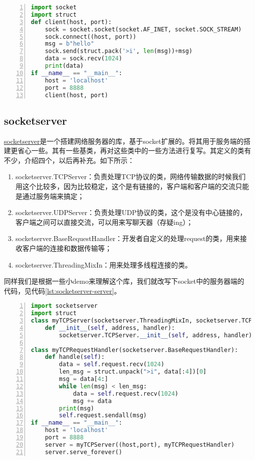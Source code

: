 \begin{lstlisting}[language = python, caption={socket客户端代码}, label={lst:socket-client}, numbers=left, 
       numberstyle=\tiny,keywordstyle=\color{blue!70},
       commentstyle=\color{red!50!green!50!blue!50},frame=shadowbox,
       rulesepcolor=\color{red!20!green!20!blue!20},basicstyle=\ttfamily]
import socket
import struct
def client(host, port):
    sock = socket.socket(socket.AF_INET, socket.SOCK_STREAM)
    sock.connect((host, port))
    msg = b"hello"
    sock.send(struct.pack('>i', len(msg))+msg)
    data = sock.recv(1024)
    print(data)
if __name__ == "__main__":
    host = 'localhost'
    port = 8888
    client(host, port)
\end{lstlisting}
\subsection{socketserver}
\href{https://docs.python.org/3/library/socketserver.html}{socketserver}是一个搭建网络服务器的库，基于socket扩展的。将其用于服务端的搭建更省心一些。其有一些基类，再对这些类中的一些方法进行复写。其定义的类有不少，介绍四个，以后再补充。如下所示：
\begin{enumerate}
  \item socketserver.TCPServer：负责处理TCP协议的类，网络传输数据的时候我们用这个比较多，因为比较稳定，这个是有链接的，客户端和客户端的交流只能是通过服务端来搞定；
  \item socketserver.UDPServer：负责处理UDP协议的类，这个是没有中心链接的，客户端之间可以直接交流，可以用来写聊天器（存疑ing）；
  \item socketserver.BaseRequestHandler：开发者自定义的处理request的类，用来接收客户端的连接和数据传输等；
  \item socketserver.ThreadingMixIn：用来处理多线程连接的类。
\end{enumerate}


同样我们是根据一些小demo来理解这个库，我们就改写下socket中的服务器端的代码，见代码\ref{lst:socketserver-server}。
\begin{lstlisting}[language = python, caption={socketserver构建服务器端代码}, label={lst:socketserver-server}, numbers=left, 
       numberstyle=\tiny,keywordstyle=\color{blue!70},
       commentstyle=\color{red!50!green!50!blue!50},frame=shadowbox,
       rulesepcolor=\color{red!20!green!20!blue!20},basicstyle=\ttfamily]
import socketserver
import struct
class myTCPServer(socketserver.ThreadingMixIn, socketserver.TCPServer):
    def __init__(self, address, handler):
        socketserver.TCPServer.__init__(self, address, handler)

class myTCPRequestHandler(socketserver.BaseRequestHandler):
    def handle(self):
        data = self.request.recv(1024)
        len_msg = struct.unpack(">i", data[:4])[0]
        msg = data[4:]
        while len(msg) < len_msg:
            data = self.request.recv(1024)
            msg += data
        print(msg)
        self.request.sendall(msg)
if __name__ == "__main__":
    host = 'localhost'
    port = 8888
    server = myTCPServer((host,port), myTCPRequestHandler)
    server.serve_forever()
\end{lstlisting}


